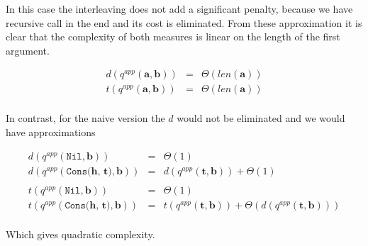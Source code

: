 In this case the interleaving does not add a significant penalty, because we have recursive call in the end and its cost is eliminated. From these approximation it is clear that the complexity of both measures is linear on the length of the first argument.

\[
\begin{array}{lcl}
d(q^{app}(\mathbf{a}, \mathbf{b})) & = & \Theta(len(\mathbf{a})) \\
t(q^{app}(\mathbf{a}, \mathbf{b})) & = & \Theta(len(\mathbf{a})) \\
\end{array}
 \]
 
In contrast, for the naive version the $d$ would not be eliminated and we would have approximations

\[
\begin{array}{lcl}
d(q^{app}(\texttt{Nil}, \mathbf{b})) & = & \Theta(1) \\
d(q^{app}(\texttt{Cons($\mathbf{h}$, $\mathbf{t}$)}, \mathbf{b})) & = & d(q^{app}(\mathbf{t}, \mathbf{b})) + \Theta(1) \\
\\
t(q^{app}(\texttt{Nil}, \mathbf{b})) & = & \Theta(1) \\
t(q^{app}(\texttt{Cons($\mathbf{h}$, $\mathbf{t}$)}, \mathbf{b})) & = & t(q^{app}(\mathbf{t}, \mathbf{b})) + \Theta(d(q^{app}(\mathbf{t}, \mathbf{b})) ) \\
\end{array}
 \]

Which gives quadratic complexity.
